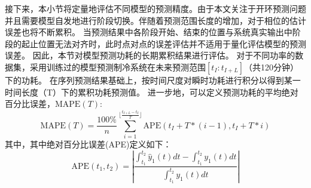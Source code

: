 接下来，本小节将定量地评估不同模型的预测精度。由于本文关注于开环预测问题并且需要模型自发地进行阶段切换。伴随着预测范围长度的增加，对于相位的估计误差也将不断累积。
当预测结果中各阶段开始、结束的位置与系统真实输出中阶段的起止位置无法对齐时，此时点对点的误差评估并不适用于量化评估模型的预测误差。
因此，本节对模型预测功耗的长期累积结果进行评估。
对于不同功率的数据集，采用训练过的模型预测制冷系统在未来预测范围$[{t_I:t_{I+L}}]$（共120分钟）下的功耗。
在序列预测结果基础上，按时间尺度对瞬时功耗进行积分以得到某一时间长度（T）下的累积功耗预测值。
进一步地，可以定义预测功耗的平均绝对百分比误差，$\text{MAPE}(T)$:
\begin{equation}
\text{MAPE}(T) = \frac{100\%}{n}\sum\limits_{i=1}^{\lfloor\frac{t_{I+L}-t_I}{T}\rfloor}\text{APE}(t_I+T*(i-1),t_I+T*i)
\label{equ:energy_mape}
\end{equation}
其中，其中绝对百分比误差(APE)定义如下：
\begin{equation}
\text{APE}(t_1,t_2) = \left|\frac{\int_{t_1}^{t_2}\hat{y}_1(t)dt-\int_{t_1}^{t_2}y_1(t)dt}{\int_{t_1}^{t_2}y_1(t)dt}\right|
\end{equation}
